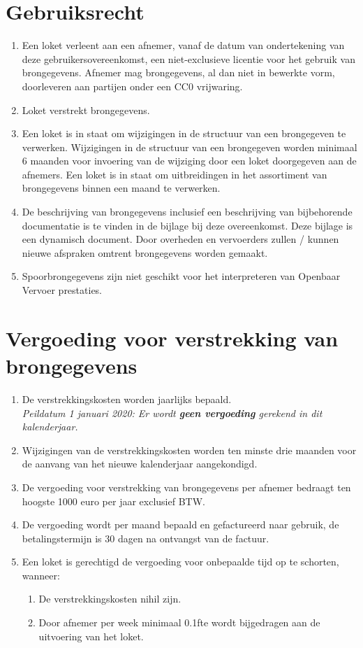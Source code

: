 \documentclass[10pt, a4paper]{article}
\begin{document}
\section{Gebruiksrecht}
\begin{enumerate}
   \item Een loket verleent aan een afnemer, vanaf de datum van ondertekening van deze gebruikersovereenkomst, een niet-exclusieve licentie voor het gebruik van brongegevens. Afnemer mag brongegevens, al dan niet in bewerkte vorm, doorleveren aan partijen onder een CC0 vrijwaring.
   \item Loket verstrekt brongegevens.
   \item Een loket is in staat om wijzigingen in de structuur van een brongegeven te verwerken. Wijzigingen in de structuur van een brongegeven worden minimaal 6 maanden voor invoering van de wijziging door een loket doorgegeven aan de afnemers. Een loket is in staat om uitbreidingen in het assortiment van brongegevens binnen een maand te verwerken.
   \item De beschrijving van brongegevens inclusief een beschrijving van bijbehorende documentatie is te vinden in de bijlage bij deze overeenkomst. Deze bijlage is een dynamisch document. Door overheden en vervoerders zullen / kunnen nieuwe afspraken omtrent brongegevens worden gemaakt.
   \item Spoorbrongegevens zijn niet geschikt voor het interpreteren van Openbaar Vervoer prestaties.
\end{enumerate}

\section{Vergoeding voor verstrekking van brongegevens}
\begin{enumerate}
   \item De verstrekkingskosten worden jaarlijks bepaald.\\ \textit{Peildatum 1 januari 2020: Er wordt \textbf{geen vergoeding} gerekend in dit kalenderjaar.}
   \item Wijzigingen van de verstrekkingskosten worden ten minste drie maanden voor de aanvang van het nieuwe kalenderjaar aangekondigd.
   \item De vergoeding voor verstrekking van brongegevens per afnemer bedraagt ten hoogste 1000 euro per jaar exclusief BTW.
   \item De vergoeding wordt per maand bepaald en gefactureerd naar gebruik, de betalingstermijn is 30 dagen na ontvangst van de factuur.
   \item Een loket is gerechtigd de vergoeding voor onbepaalde tijd op te schorten, wanneer:
   \begin{enumerate}
        \item De verstrekkingskosten nihil zijn.
        \item Door afnemer per week minimaal 0.1fte wordt bijgedragen aan de uitvoering van het loket.
   \end{enumerate}
\end{enumerate}
\end{document}
